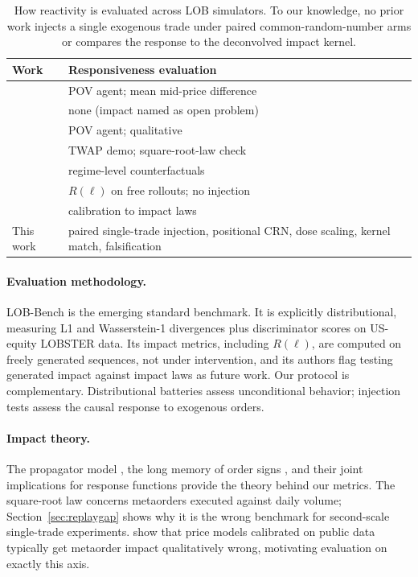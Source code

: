 \documentclass[sigconf,anonymous]{acmart}
\newcommand{\Rl}{R(\ell)}
\begin{document}
\begin{table}[t]
\centering
\small
\begin{tabular}{p{2.45cm}p{4.9cm}}
\toprule
Work & Responsiveness evaluation \\
\midrule
\citet{coletta2021,coletta2022} & POV agent; mean mid-price difference \\
\citet{nagy2023} & none (impact named as open problem) \\
\citet{trades2025} & POV agent; qualitative \\
\citet{mars2025} & TWAP demo; square-root-law check \\
\citet{difflob2026} & regime-level counterfactuals \\
\citet{lobbench2025} & $\Rl$ on free rollouts; no injection \\
\citet{noble2026} & calibration to impact laws \\
\midrule
This work & paired single-trade injection, positional CRN, dose scaling, kernel match, falsification \\
\bottomrule
\end{tabular}
\caption{How reactivity is evaluated across LOB simulators. To our knowledge, no prior work injects a single exogenous trade under paired common-random-number arms or compares the response to the deconvolved impact kernel.}
\label{tab:related}
\end{table}

\paragraph{Evaluation methodology.} LOB-Bench \citep{lobbench2025} is the emerging standard benchmark. It is explicitly distributional, measuring L1 and Wasserstein-1 divergences plus discriminator scores on US-equity LOBSTER data. Its impact metrics, including $\Rl$, are computed on freely generated sequences, not under intervention, and its authors flag testing generated impact against impact laws as future work. Our protocol is complementary. Distributional batteries assess unconditional behavior; injection tests assess the causal response to exogenous orders.

\paragraph{Impact theory.} The propagator model \citep{bouchaud2004}, the long memory of order signs \citep{lillofarmer2004,lmf2005}, and their joint implications for response functions \citep{bouchaud2009,taranto2016,gatheral2010} provide the theory behind our metrics. The square-root law \citep{toth2011} concerns metaorders executed against daily volume; Section~\ref{sec:replaygap} shows why it is the wrong benchmark for second-scale single-trade experiments. \citet{naviglio2025} show that price models calibrated on public data typically get metaorder impact qualitatively wrong, motivating evaluation on exactly this axis.
\end{document}
